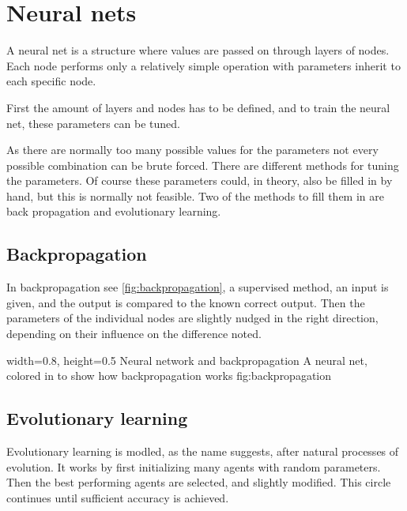 \section{Neural nets} 
\label{sec:NN}
\cite[p. 727]{MA}
A neural net is a structure where values are passed on through layers of nodes. Each node performs only a relatively simple operation with parameters inherit to each specific node.

First the amount of layers and nodes has to be defined, and to train the neural net, these parameters can be tuned.

As there are normally too many possible values for the parameters not every possible combination can be brute forced. There are different methods for tuning the parameters. Of course these parameters could, in theory, also be filled in by hand, but this is normally not feasible. Two of the methods to fill them in are back propagation and evolutionary learning.

\subsection{Backpropagation}
In backpropagation see \autoref{fig:backpropagation}, a supervised method, an input is given, and the output is compared to the known correct output. Then the parameters of the individual nodes are slightly nudged in the right direction, depending on their influence on the difference noted. 

    {width=0.8\textwidth, height=0.5\textheight} %
    {Neural network and backpropagation}   %
    {A neural net, colored in to show how backpropagation works}   %
    {fig:backpropagation}    %
    
\subsection{Evolutionary learning}
Evolutionary learning is modled, as the name suggests, after natural processes of evolution. It works by first initializing many agents with random parameters. Then the best performing agents are selected, and slightly modified. This circle continues until sufficient accuracy is achieved.